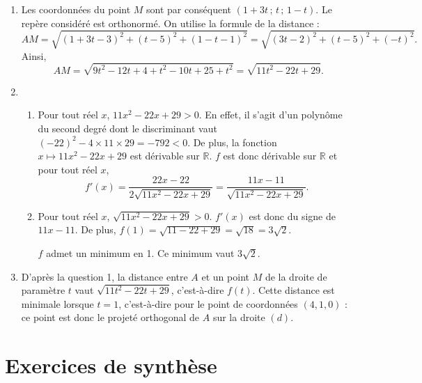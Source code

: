 \documentclass[11pt,fleqn, openany]{book} %
\begin{document}
\begin{solution}\hspace{0pt}

\begin{enumerate}
\item Les coordonnées du point $M$ sont par conséquent $(1+3t\, ;\,t\,;\,1-t)$. Le repère considéré est orthonormé. On utilise la formule de la distance :
\[ AM = \sqrt{ (1+3t-3)^2+(t-5)^2 + (1-t-1)^2 } = \sqrt{(3t-2)^2+(t-5)^2+(-t)^2}.\]
Ainsi,
\[ AM = \sqrt{9t^2-12t+4+t^2-10t+25+t^2}=\sqrt{11t^2-22t+29}.\]
\item 
\begin{enumerate}
\item Pour tout réel $x$, $11x^2-22x+29>0$. En effet, il s'agit d'un polynôme du second degré dont le discriminant vaut $(-22)^2-4 \times 11 \times 29 = -792 <0$. De plus, la fonction $x\mapsto 11x^2-22x+29$ est dérivable sur $\mathbb{R}$. $f$ est donc dérivable sur $\mathbb{R}$ et pour tout réel $x$,
\[f'(x) = \dfrac{22x-22}{2\sqrt{11x^2-22x+29}}=\dfrac{11x-11}{\sqrt{11x^2-22x+29}}.\]
\item Pour tout réel $x$, $\sqrt{11x^2-22x+29}>0$. $f'(x)$ est donc du signe de $11x-11$. De plus, $f(1)=\sqrt{11-22+29}=\sqrt{18}=3\sqrt{2}$.

\begin{center}
\end{center}

$f$ admet un minimum en 1. Ce minimum vaut $3\sqrt{2}$.
\end{enumerate}
\item D'après la question 1, la distance entre $A$ et un point $M$ de la droite de paramètre $t$ vaut $\sqrt{11t^2-22t+29}$, c'est-à-dire $f(t)$. Cette distance est minimale lorsque $t=1$, c'est-à-dire pour le point de coordonnées $(4,1,0)$ : ce point est donc le projeté orthogonal de $A$ sur la droite $(d)$.
\end{enumerate} \end{solution}


\section*{Exercices de synthèse}
\end{document}
